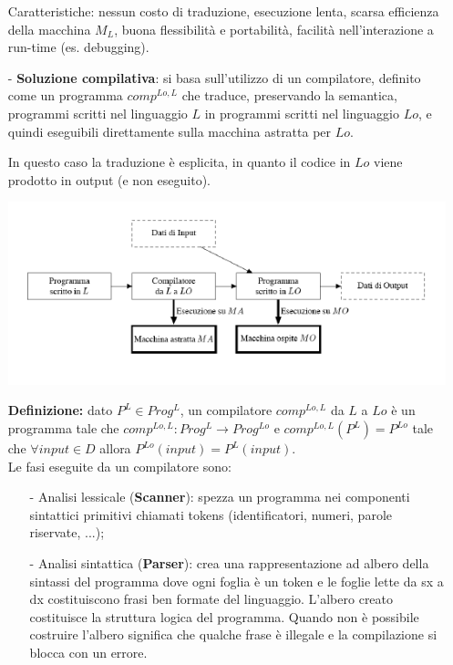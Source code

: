 \documentclass[a4paper, 10pt]{report}
\begin{document}
\begin{itemize}
\noindent Caratteristiche: nessun costo di
traduzione, esecuzione lenta, scarsa efficienza della
macchina $M_L$, buona flessibilità e portabilità, facilità nell'interazione a run-time (es. debugging).

\item[-] \textbf{Soluzione compilativa}: si basa sull'utilizzo di un compilatore, definito come un programma $comp^{Lo, L}$ che traduce, preservando la semantica, programmi scritti nel linguaggio $L$ in programmi scritti nel linguaggio $Lo$, e quindi eseguibili direttamente sulla macchina astratta per $Lo$.

In questo caso la traduzione è esplicita, in quanto il codice in $Lo$ viene prodotto in output (e non eseguito).

\begin{center}
\includegraphics[scale=1.5]{compilatore.pdf}
\end{center}

\noindent \textbf{Definizione:} dato $P^L \in Prog^L$, un compilatore $comp^{Lo, L}$ da $L$ a $Lo$ è un programma tale che $comp^{Lo, L}: Prog^L \rightarrow Prog^{Lo}$ e $comp^{Lo, L}(P^L) = P^{Lo}$ tale che $\forall input \in D$ allora $P^{Lo}(input) = P^L(input)$.\\

Le fasi eseguite da un compilatore sono: 
\begin{itemize}
\item[-] Analisi lessicale (\textbf{Scanner}): spezza  un  programma  nei componenti   sintattici   primitivi  chiamati tokens (identificatori,   numeri, parole riservate, ...);
\item[-] Analisi sintattica (\textbf{Parser}): crea una rappresentazione ad albero  della  sintassi  del  programma  dove  ogni  foglia  è un  token  e  le  foglie  lette  da  sx  a  dx  costituiscono  frasi ben  formate  del  linguaggio. L'albero creato costituisce  la struttura logica del programma. Quando non è possibile costruire l’albero significa che qualche frase è illegale e la compilazione si blocca con un errore.
\end{itemize}


\end{itemize}
\end{document}
